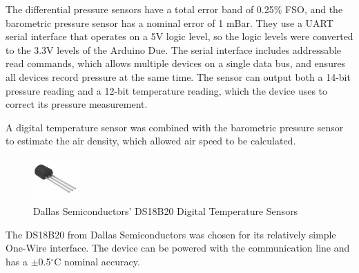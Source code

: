 The differential pressure sensors have a total error band of 0.25\% FSO, and the barometric pressure sensor has a nominal error of 1 mBar. They use a UART serial interface that operates on a 5V logic level, so the logic levels were converted to the 3.3V levels of the Arduino Due. The serial interface includes addressable read commands, which allows multiple devices on a single data bus, and ensures all devices record pressure at the same time. The sensor can output both a 14-bit pressure reading and a 12-bit temperature reading, which the device uses to correct its pressure measurement.

A digital temperature sensor was combined with the barometric pressure sensor to estimate the air density, which allowed air speed to be calculated.

\begin{figure}[H]
  \centering
    \includegraphics[width=0.15\textwidth]{figures/ds18b20Picture.jpg}
  \caption{Dallas Semiconductors' DS18B20 Digital Temperature Sensors} \label{ds18b20Picture}
\end{figure}

 The DS18B20 from Dallas Semiconductors was chosen for its relatively simple One-Wire interface. The device can be powered with the communication line and has a $\pm$0.5$^\circ$C nominal accuracy\cite{DS18B20Datasheet}.

